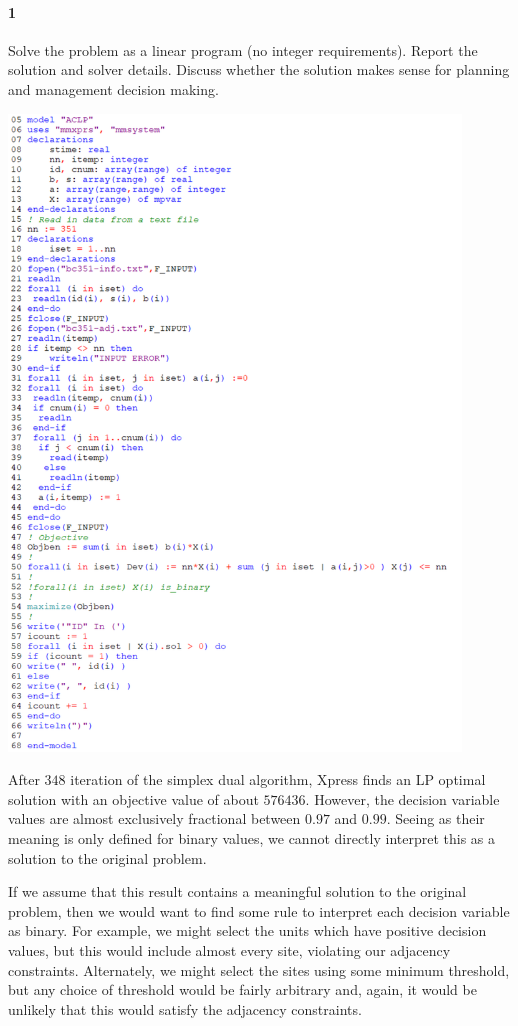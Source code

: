 \documentclass[12pt]{article}
\newenvironment{fullbox}{\begin{lrbox}{\savefullbox}\begin{minipage}{\dimexpr\textwidth-2\fboxsep\relax}}{\end{minipage}\end{lrbox}\begin{center}\framebox[\textwidth]{\usebox{\savefullbox}}\end{center}}
\newenvironment{pbox}[1][]{\begin{fullbox}\ifx#1\empty\else\paragraph{#1}\fi}{\end{fullbox}}
\theoremstyle{definition}
\begin{document}
\thispagestyle{title}


\begin{pbox}[1]
    Solve the problem as a linear program (no integer requirements). Report the solution and solver details. Discuss whether the solution makes sense for planning and management decision making.
\end{pbox}

\begin{center}
    \includegraphics[width=0.9\textwidth]{code1.png}
\end{center}

After $348$ iteration of the simplex dual algorithm, Xpress finds an LP optimal solution with an objective value of about $576436$. However, the decision variable values are almost exclusively fractional between $0.97$ and $0.99$. Seeing as their meaning is only defined for binary values, we cannot directly interpret this as a solution to the original problem.

If we assume that this result contains a meaningful solution to the original problem, then we would want to find some rule to interpret each decision variable as binary. For example, we might select the units which have positive decision values, but this would include almost every site, violating our adjacency constraints. Alternately, we might select the sites using some minimum threshold, but any choice of threshold would be fairly arbitrary and, again, it would be unlikely that this would satisfy the adjacency constraints. 
\end{document}
